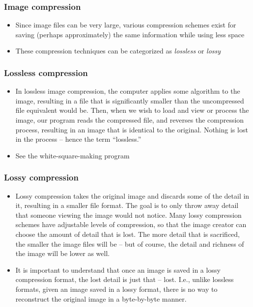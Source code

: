\documentclass{beamer}
\begin{document}
\begin{frame}
	\frametitle{Image compression}

	\begin{itemize}
	
		\item Since image files can be very large, various compression schemes exist for saving (perhaps approximately) the same information while using less space

		\item These compression techniques can be categorized as {\em lossless} or {\em lossy}

	\end{itemize}

\end{frame}

\begin{frame}
	\frametitle{Lossless compression}

	\begin{itemize}

		\item In lossless image compression, the computer applies some algorithm to the image, resulting in a file that is significantly smaller than the uncompressed file equivalent would be. Then, when we wish to load and view or process the image, our program reads the compressed file, and reverses the compression process, resulting in an image that is identical to the original. Nothing is lost in the process – hence the term ``lossless.''

		\item See the white-square-making program
	\end{itemize}
\end{frame}

\begin{frame}
	\frametitle{Lossy compression}

	\begin{itemize}

		\item Lossy compression takes the original image and discards some of the detail in it, resulting in a smaller file format. The goal is to only throw away detail that someone viewing the image would not notice. Many lossy compression schemes have adjustable levels of compression, so that the image creator can choose the amount of detail that is lost. The more detail that is sacrificed, the smaller the image files will be -- but of course, the detail and richness of the image will be lower as well.

		\item It is important to understand that once an image is saved in a lossy compression format, the lost detail is just that -- lost. I.e., unlike lossless formats, given an image saved in a lossy format, there is no way to reconstruct the original image in a byte-by-byte manner.

	\end{itemize}

\end{frame}
\end{document}
